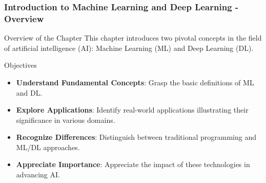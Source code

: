 \documentclass[aspectratio=169]{beamer}
\begin{document}
\frame{\titlepage}

\begin{frame}[fragile]
    \frametitle{Introduction to Machine Learning and Deep Learning - Overview}
    \begin{block}{Overview of the Chapter}
        This chapter introduces two pivotal concepts in the field of artificial intelligence (AI): 
        Machine Learning (ML) and Deep Learning (DL).
    \end{block}
    
    \begin{block}{Objectives}
        \begin{itemize}
            \item \textbf{Understand Fundamental Concepts}: Grasp the basic definitions of ML and DL.
            \item \textbf{Explore Applications}: Identify real-world applications illustrating their significance in various domains.
            \item \textbf{Recognize Differences}: Distinguish between traditional programming and ML/DL approaches.
            \item \textbf{Appreciate Importance}: Appreciate the impact of these technologies in advancing AI.
        \end{itemize}
    \end{block}
\end{frame}
\end{document}
